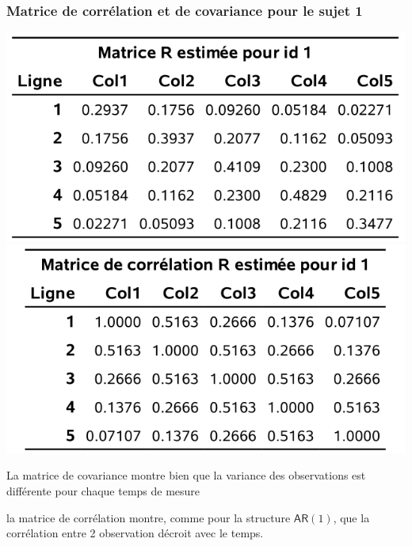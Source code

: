 \documentclass{beamer}
\begin{document}
\begin{frame}[fragile]
\frametitle{Matrice de corrélation et de covariance pour le sujet 1}
\begin{center}
\includegraphics[width = 0.45\linewidth]{img/c5/diapos6-e18a}
\includegraphics[width = 0.45\linewidth]{img/c5/diapos6-e18b}
\end{center}
\bi
\item La matrice de covariance montre bien que la variance des observations est différente pour chaque temps de mesure
\item la matrice de corrélation montre, comme pour la structure $\mathsf{AR}(1)$, que la corrélation entre 2 observation décroit avec le temps.
\ei
\end{frame}
\end{document}
